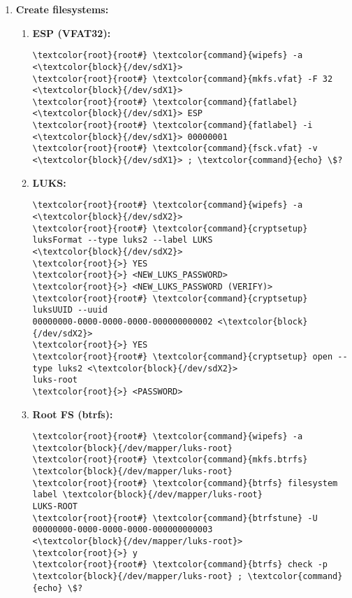 \documentclass[10pt, a4paper, onecolumn, oneside, titlepage, openany]{book}
\begin{document}
\begin{enumerate}
\begin{enumerate}
        \item \textbf{Name partitions:}
\begin{Verbatim}[commandchars=\\\{\}]
\textcolor{root}{root#} \textcolor{command}{parted} -s <\textcolor{block}{/dev/sdX}> name 1 ESP
\textcolor{root}{root#} \textcolor{command}{parted} -s <\textcolor{block}{/dev/sdX}> name 2 LUKS
\end{Verbatim}
    \end{enumerate}
    \item \textbf{Create filesystems:}
    \begin{enumerate}
        \item \textbf{ESP (VFAT32):}
\begin{Verbatim}[commandchars=\\\{\}]
\textcolor{root}{root#} \textcolor{command}{wipefs} -a <\textcolor{block}{/dev/sdX1}>
\textcolor{root}{root#} \textcolor{command}{mkfs.vfat} -F 32 <\textcolor{block}{/dev/sdX1}>
\textcolor{root}{root#} \textcolor{command}{fatlabel} <\textcolor{block}{/dev/sdX1}> ESP
\textcolor{root}{root#} \textcolor{command}{fatlabel} -i <\textcolor{block}{/dev/sdX1}> 00000001
\textcolor{root}{root#} \textcolor{command}{fsck.vfat} -v <\textcolor{block}{/dev/sdX1}> ; \textcolor{command}{echo} \$?
\end{Verbatim}
        \item \textbf{LUKS:}
\begin{Verbatim}[commandchars=\\\{\}]
\textcolor{root}{root#} \textcolor{command}{wipefs} -a <\textcolor{block}{/dev/sdX2}>
\textcolor{root}{root#} \textcolor{command}{cryptsetup} luksFormat --type luks2 --label LUKS
<\textcolor{block}{/dev/sdX2}>
\textcolor{root}{>} YES
\textcolor{root}{>} <NEW_LUKS_PASSWORD>
\textcolor{root}{>} <NEW_LUKS_PASSWORD (VERIFY)>
\textcolor{root}{root#} \textcolor{command}{cryptsetup} luksUUID --uuid
00000000-0000-0000-0000-000000000002 <\textcolor{block}{/dev/sdX2}>
\textcolor{root}{>} YES
\textcolor{root}{root#} \textcolor{command}{cryptsetup} open --type luks2 <\textcolor{block}{/dev/sdX2}>
luks-root
\textcolor{root}{>} <PASSWORD>
\end{Verbatim}
        \item \textbf{Root FS (btrfs):}
\begin{Verbatim}[commandchars=\\\{\}]
\textcolor{root}{root#} \textcolor{command}{wipefs} -a \textcolor{block}{/dev/mapper/luks-root}
\textcolor{root}{root#} \textcolor{command}{mkfs.btrfs} \textcolor{block}{/dev/mapper/luks-root}
\textcolor{root}{root#} \textcolor{command}{btrfs} filesystem label \textcolor{block}{/dev/mapper/luks-root}
LUKS-ROOT
\textcolor{root}{root#} \textcolor{command}{btrfstune} -U 00000000-0000-0000-0000-000000000003
<\textcolor{block}{/dev/mapper/luks-root}>
\textcolor{root}{>} y
\textcolor{root}{root#} \textcolor{command}{btrfs} check -p \textcolor{block}{/dev/mapper/luks-root} ; \textcolor{command}{echo} \$?
\end{Verbatim}
    \end{enumerate}
\end{enumerate}
\end{document}
